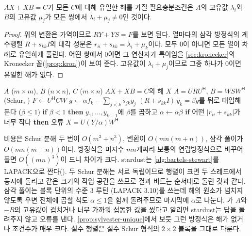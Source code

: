 \begin{proposition}
\label{prop:sylvester-unique}
$AX+XB=C$가 모든 $C$에 대해 유일한 해를 가질 필요충분조건은 $A$의 고유값 $\lambda_i$와 $B$의 고유값 $\mu_j$가 모든 쌍에서 $\lambda_i+\mu_j\ne0$인 것이다.
\end{proposition}

\begin{proof}
위의 변환은 가역이므로 $RY+YS=F$를 보면 된다. 열마다의 삼각 방정식의 계수행렬 $R+s_{kk}I$의 대각 성분은 $r_{ii}+s_{kk}=\lambda_i+\mu_k$이다. 모두 $0$이 아니면 모든 열이 차례로 유일하게 풀린다. 어떤 쌍에서 $0$이면 그 연산자가 특이임을 \cref{sec:kronecker}의 Kronecker 꼴(\cref{prop:kron})이 보여 준다. 고유값이 $\lambda_i+\mu_j$이므로 그중 하나가 $0$이면 유일한 해가 없다.
\end{proof}

\begin{algorithm}[htbp]
\begin{algorithmic}[1]
\Require $A$ ($m\times m$), $B$ ($n\times n$), $C$ ($m\times n$)
\Ensure $AX+XB=C$의 해 $X$
\State $A=URU^{\mathsf H}$, $B=WSW^{\mathsf H}$ (Schur, ) 
\State $F\gets U^{\mathsf H}CW$ 
 
  \State $g\gets\alpha f_k-\sum_{j<k}s_{jk}y_j$ 
  \State $(R+s_{kk}I)\,y_k=\beta g$를 뒤로 대입해 푼다 ($\beta\le1$) 
  \State \textbf{if} $\beta<1$ \textbf{then} $y_1,\dots,y_{k-1}$에 $\beta$를 곱하고 $\alpha\gets\alpha\beta$
\EndFor
\State \textbf{if} 어떤 $|r_{ii}+s_{kk}|$가 너무 작다 \textbf{then} 오류 
\State \Return $X=U(Y/\alpha)W^{\mathsf H}$ 
\end{algorithmic}
\caption{Bartels--Stewart 알고리즘 (stardust )}
\label{alg:bartels-stewart}
\end{algorithm}

비용은 Schur 분해 두 번이 $O(m^3+n^3)$, 변환이 $O(mn(m+n))$, 삼각 풀이가 $O(mn(m+n))$이다. 방정식을 미지수 $mn$개짜리 보통의 연립방정식으로 바꾸어 풀면 $O((mn)^3)$이 드니 차이가 크다. stardust는 \cref{alg:bartels-stewart}를 LAPACK으로 짠다(). 두 Schur 분해는 서로 독립이므로 행렬이 크면 두 스레드에서 동시에 돌리고 같은 크기의 작업 공간을 쓰므로 결과 비트는 순서대로 돌린 것과 같다. 삼각 풀이는 블록 단위의 수준 3 루틴 (LAPACK 3.10)를 쓰는데 해의 원소가 넘치지 않도록 우변 전체에 곱할 척도 $\alpha\le1$을 함께 돌려주므로 마지막에 $\alpha$로 나눈다. 가 $A$와 $-B$의 고유값이 겹치거나 너무 가까워 섭동한 값을 썼다고 알리면 stardust는 답을 돌려주지 않고 오류를 낸다. \cref{prop:sylvester-unique}에서 보듯 그런 방정식은 해가 없거나 조건수가 매우 크다. 실수 행렬은 실수 Schur 형식의 $2\times2$ 블록을 그대로 다룬다.

